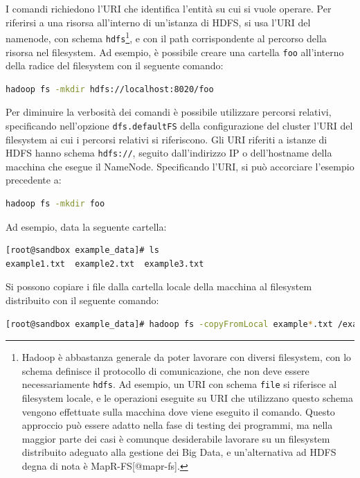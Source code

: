 \documentclass[italian,a4paper, twoside, 12pt]{report}
\begin{document}
I comandi richiedono l'URI che identifica l'entità su cui si vuole
operare. Per riferirsi a una risorsa all'interno di un'istanza di HDFS,
si usa l'URI del namenode, con schema \lstinline!hdfs!\footnote{Hadoop è
  abbastanza generale da poter lavorare con diversi filesystem, con lo
  schema definisce il protocollo di comunicazione, che non deve essere
  necessariamente \lstinline!hdfs!. Ad esempio, un URI con schema
  \lstinline!file! si riferisce al filesystem locale, e le operazioni
  eseguite su URI che utilizzano questo schema vengono effettuate sulla
  macchina dove viene eseguito il comando. Questo approccio può essere
  adatto nella fase di testing dei programmi, ma nella maggior parte dei
  casi è comunque desiderabile lavorare su un filesystem distribuito
  adeguato alla gestione dei Big Data, e un'alternativa ad HDFS degna di
  nota è MapR-FS{[}@mapr-fs{]}.}, e con il path corrispondente al
percorso della risorsa nel filesystem. Ad esempio, è possibile creare
una cartella \lstinline!foo! all'interno della radice del filesystem con
il seguente comando:

\begin{lstlisting}[language=sh]
hadoop fs -mkdir hdfs://localhost:8020/foo
\end{lstlisting}

Per diminuire la verbosità dei comandi è possibile utilizzare percorsi
relativi, specificando nell'opzione \lstinline!dfs.defaultFS! della
configurazione del cluster l'URI del filesystem ai cui i percorsi
relativi si riferiscono. Gli URI riferiti a istanze di HDFS hanno schema
\lstinline!hdfs://!, seguito dall'indirizzo IP o dell'hostname della
macchina che esegue il NameNode. Specificando l'URI, si può accorciare
l'esempio precedente a:

\begin{lstlisting}[language=sh]
hadoop fs -mkdir foo
\end{lstlisting}

Ad esempio, data la seguente cartella:

\begin{lstlisting}[language=sh]
[root@sandbox example_data]# ls
example1.txt  example2.txt  example3.txt
\end{lstlisting}

Si possono copiare i file dalla cartella locale della macchina al
filesystem distribuito con il seguente comando:

\begin{lstlisting}[language=sh]
[root@sandbox example_data]# hadoop fs -copyFromLocal example*.txt /example
\end{lstlisting}
\end{document}
